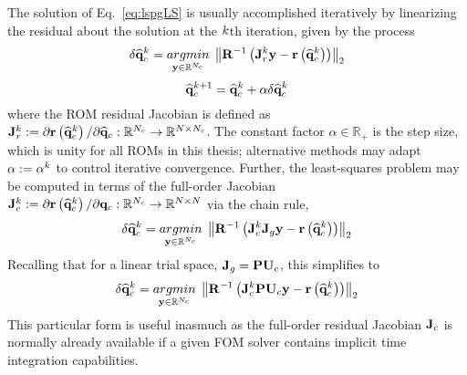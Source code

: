 The solution of Eq.~\ref{eq:lspgLS} is usually accomplished iteratively by linearizing the residual about the solution at the $k$th iteration, given by the process
%
\begin{equation}\label{eq:lspgLSLin}
    \delta \consVecCoef^{\newtonIdx} = \argmin{\dummyVec \inROne{\numConsModes}} \left\Vert \resScaleInv \left(\jacobRes^{\newtonIdx} \dummyVec - \resFunc{\consVecCoef^{\newtonIdx}}\right) \right\Vert_2
\end{equation}
\begin{equation}
    \mathbf{\widehat{q}}_{c}^{k + 1} = \mathbf{\widehat{q}}_{c}^{k} + \alpha \delta \mathbf{\widehat{q}}_{c}^{k}
\end{equation}
%
where the ROM residual Jacobian is defined as $\mathbf{J}_{r}^{k} := \partial \mathbf{r}\left(\mathbf{\widehat{q}}_{c}^{k}\right) / \partial \mathbf{\widehat{q}}_{c}: \mathbb{R}^{N_c} \rightarrow \mathbb{R}^{N \times N_c}$. The constant factor $\alpha \in \mathbb{R}_+$ is the step size, which is unity for all ROMs in this thesis; alternative methods may adapt $\alpha := \alpha^{k}$ to control iterative convergence. Further, the least-squares problem may be computed in terms of the full-order Jacobian $\mathbf{J}_{c}^{k} := \partial \mathbf{r}\left(\mathbf{\widehat{q}}_{c}^{k}\right) / \partial \mathbf{q}_{c}: \mathbb{R}^{N_c} \rightarrow \mathbb{R}^{N \times N}$ via the chain rule,
%
\begin{equation}
    \delta \consVecCoef^{\newtonIdx} = \argmin{\dummyVec \inROne{\numConsModes}} \left\Vert \resScaleInv \left(\jacobCons^{\newtonIdx} \jacobDecode \dummyVec - \resFunc{\consVecCoef^{\newtonIdx}}\right) \right\Vert_2
\end{equation}
%
Recalling that for a linear trial space, $\jacobDecode = \consScale \consTrial$, this simplifies to
%
\begin{equation}
    \delta \consVecCoef^{\newtonIdx} = \argmin{\dummyVec \inROne{\numConsModes}} \left\Vert \resScaleInv \left(\jacobCons^{\newtonIdx} \consScale \consTrial \dummyVec - \resFunc{\consVecCoef^{\newtonIdx}}\right) \right\Vert_2
\end{equation}
%
This particular form is useful inasmuch as the full-order residual Jacobian $\mathbf{J}_{c}$ is normally already available if a given FOM solver contains implicit time integration capabilities.  

